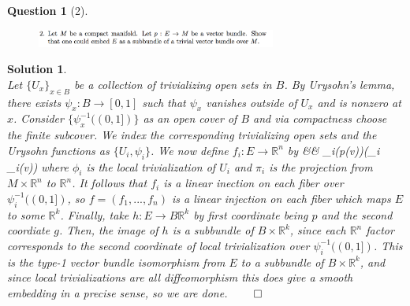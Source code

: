 \documentclass{article} %
\def\eQb#1\eQe{\begin{eqnarray*}#1\end{eqnarray*}}
\theoremstyle{quest}
\newtheorem*{question}{Question}
\newtheorem*{solution}{Solution}
\begin{document}
\begin{question}[2]
\hfill
\begin{figure}[h!]
  \centering
    \includegraphics[width=0.7\textwidth]{DG-e3-p2.png}
\end{figure}
\end{question}
\begin{solution} \hfill \\
Let $\{U_x\}_{x \in B}$ be a collection of trivializing open sets in $B$. By 
Urysohn's lemma, there exists $\psi_x:B \to [0,1]$ such that $\psi_x$ vanishes
outside of $U_x$ and is nonzero at $x$. Consider $\{\psi_x^{-1}((0,1])\}$ 
as an open cover of $B$ and via compactness choose the finite subcover. We index
the corresponding trivializing open sets and the Urysohn functions as $\{ 
U_i, \psi_i\}$. We now define $f_i:E \to \mathbb{R}^n$ by 
\eQb
v &\mapsto& \psi_i(p(v))(\pi_i \phi_i(v))
\eQe 
where $\phi_i$ is the local trivialization of $U_i$ and $\pi_i$ is the 
projection from $M \times \mathbb{R}^n$ to $\mathbb{R}^n$. It follows that
$f_i$ is a linear inection on each fiber over $\psi_i^{-1}((0,1])$, so 
$f = (f_1,...,f_n)$ is a linear injection on each fiber which maps $E$ to 
some $\mathbb{R}^{k}$. Finally, take $h:E \to B \mathbb{R}^k$ by
first coordinate being $p$ and the second coordiate $g$. Then, the image of 
$h$ is a subbundle of $B \times \mathbb{R}^k$, since each $\mathbb{R}^n$ factor 
corresponds to the second coordinate of 
local trivialization over $\psi_i^{-1}((0,1])$.
This is the type-1 vector bundle isomorphism from $E$ to a subbundle of $B 
\times \mathbb{R}^k$, and since local trivializations are all diffeomorphism
this does give a smooth embedding in a precise sense,  so we are done. \hfill $\qed$


\end{solution}

\newpage
\end{document}
